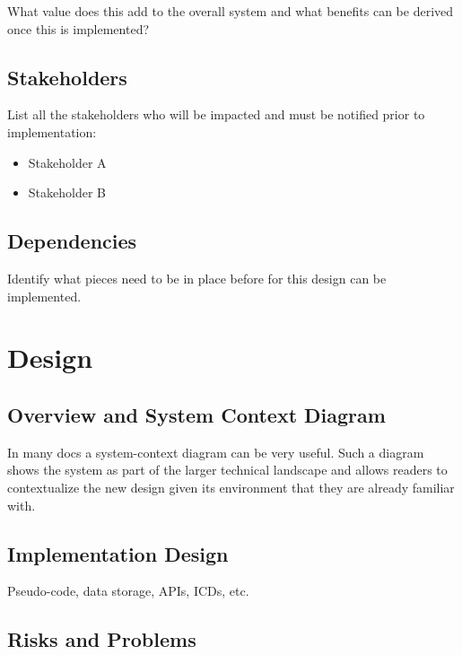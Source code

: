 \documentclass{article}
\begin{document}
What value does this add to the overall system and what benefits can be derived once this is implemented?

\subsection{Stakeholders}

List all the stakeholders who will be impacted and must be notified prior to implementation:

\begin{itemize}
    \item Stakeholder A
    \item Stakeholder B
\end{itemize}

\subsection{Dependencies}

Identify what pieces need to be in place before for this design can be implemented.

\pagebreak
\section{Design}

\subsection{Overview and System Context Diagram}

In many docs a system-context diagram can be very useful. Such a diagram shows the system as part of the larger technical landscape and allows readers to contextualize the new design given its environment that they are already familiar with.

\subsection{Implementation Design}

Pseudo-code, data storage, APIs, ICDs, etc.

\subsection{Risks and Problems}
\end{document}
